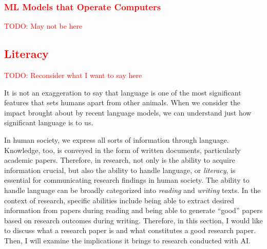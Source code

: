 \documentclass{book}
\begin{document}
\subsubsection{\textcolor{red}{ML Models that Operate Computers}}
\textcolor{red}{TODO: May not be here}

\subsection{\textcolor{red}{Literacy}}
\textcolor{red}{TODO: Reconsider what I want to say here}

It is not an exaggeration to say that language is one of the most significant features that sets humans apart from other animals. When we consider the impact brought about by recent language models, we can understand just how significant language is to us.

In human society, we express all sorts of information through language. Knowledge, too, is conveyed in the form of written documents, particularly academic papers. Therefore, in research, not only is the ability to acquire information crucial, but also the ability to handle language, or \textit{literacy}, is essential for communicating research findings in human society. The ability to handle language can be broadly categorized into \textit{reading} and \textit{writing} texts. In the context of research, specific abilities include being able to extract desired information from papers during reading and being able to generate ``good'' papers based on research outcomes during writing. Therefore, in this section, I would like to discuss what a research paper is and what constitutes a good research paper. Then, I will examine the implications it brings to research conducted with AI.


\end{document}
